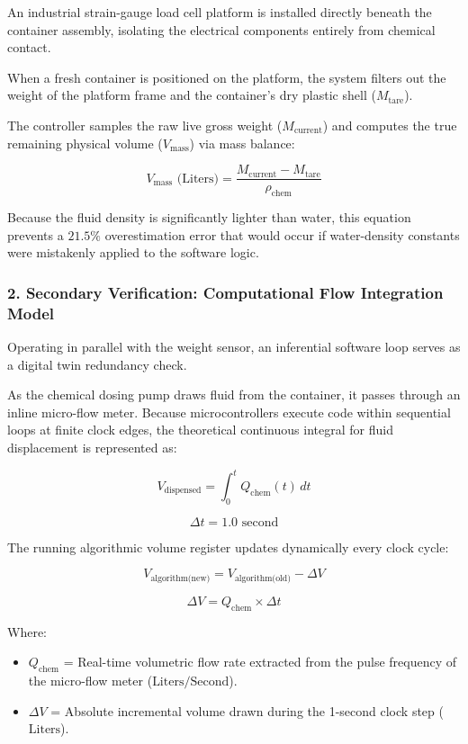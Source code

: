 \documentclass[12pt,a4paper]{article}
\begin{document}
An industrial strain-gauge load cell platform is installed directly beneath the container assembly, isolating the electrical components entirely from chemical contact.

When a fresh container is positioned on the platform, the system filters out the weight of the platform frame and the container's dry plastic shell ($M_{\text{tare}}$).

The controller samples the raw live gross weight ($M_{\text{current}}$) and computes the true remaining physical volume ($V_{\text{mass}}$) via mass balance:

\[
V_{\text{mass}} \text{ (Liters)}
=
\frac{M_{\text{current}} - M_{\text{tare}}}{\rho_{\text{chem}}}
\]

Because the fluid density is significantly lighter than water, this equation prevents a $21.5\%$ overestimation error that would occur if water-density constants were mistakenly applied to the software logic.

\subsubsection*{2. Secondary Verification: Computational Flow Integration Model}

Operating in parallel with the weight sensor, an inferential software loop serves as a digital twin redundancy check.

As the chemical dosing pump draws fluid from the container, it passes through an inline micro-flow meter. Because microcontrollers execute code within sequential loops at finite clock edges, the theoretical continuous integral for fluid displacement is represented as:

\[
V_{\text{dispensed}} = \int_{0}^{t} Q_{\text{chem}}(t)\,dt
\]

\[
\Delta t = 1.0\text{ second}
\]

The running algorithmic volume register updates dynamically every clock cycle:

\[
V_{\text{algorithm(new)}} = V_{\text{algorithm(old)}} - \Delta V
\]

\[
\Delta V = Q_{\text{chem}} \times \Delta t
\]

Where:
\begin{itemize}
    \item $Q_{\text{chem}}$ = Real-time volumetric flow rate extracted from the pulse frequency of the micro-flow meter ($\text{Liters/Second}$).
    \item $\Delta V$ = Absolute incremental volume drawn during the 1-second clock step ($\text{Liters}$).
\end{itemize}
\end{document}
